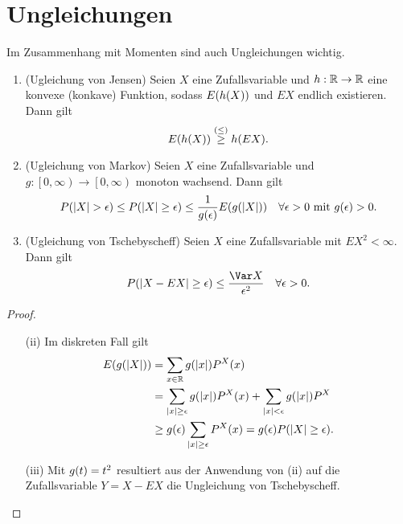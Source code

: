 \documentclass{lecture}
\begin{document}
    \section*{Ungleichungen}

    Im Zusammenhang mit Momenten sind auch Ungleichungen wichtig.

    \begin{theorem}
        \begin{enumerate}
            \item (Ugleichung von Jensen) Seien \(X\) eine Zufallsvariable und \(h: \mathbb{R} \to \mathbb{R}\) eine konvexe (konkave) Funktion, sodass \(E\parentheses*{h\parentheses*{X}}\) und \(EX\) endlich existieren.
            Dann gilt
            \[
                E\parentheses*{h\parentheses*{X}} \stackrel{\parentheses*{\le}}{\ge} h\parentheses*{EX}.
            \]
            \item (Ugleichung von Markov) Seien \(X\) eine Zufallsvariable und \(g: \left[0, \infty\right) \to \left[0, \infty\right)\) monoton wachsend.
            Dann gilt
            \[
                P\parentheses*{\absolute*{X} > \epsilon} \le P\parentheses*{\absolute*{X} \ge \epsilon} \le \frac{1}{g\parentheses*{\epsilon}}E\parentheses*{g\parentheses*{\absolute*{X}}} \quad \forall\epsilon > 0\text{ mit }g\parentheses*{\epsilon} > 0.
            \]
            \item (Ugleichung von Tschebyscheff) Seien \(X\) eine Zufallsvariable mit \(EX^2 < \infty\).
            Dann gilt
            \[
                P\parentheses*{\absolute*{X - EX} \ge \epsilon} \le \frac{\Var X}{\epsilon^2} \quad \forall\epsilon > 0.
            \]
        \end{enumerate}
    \end{theorem}

    \begin{proof}
        \begin{enumerate}
            \item[(ii)] Im diskreten Fall gilt
            \begin{align*}
                E\parentheses*{g\parentheses*{\absolute*{X}}} &= \sum_{x \in \R}g\parentheses*{\absolute*{x}}P^X\parentheses*{x}\\
                &= \sum_{\absolute*{x} \ge \epsilon}g\parentheses*{\absolute*{x}}P^X\parentheses*{x} + \sum_{\absolute*{x} < \epsilon}g\parentheses*{\absolute*{x}}P^X\\
                &\ge g\parentheses*{\epsilon}\sum_{\absolute*{x} \ge \epsilon}P^X\parentheses*{x} = g\parentheses*{\epsilon}P\parentheses*{\absolute*{X} \ge \epsilon}.
            \end{align*}
            \item[(iii)] Mit \(g\parentheses*{t} = t^2\) resultiert aus der Anwendung von (ii) auf die Zufallsvariable \(Y = X - EX\) die Ungleichung von Tschebyscheff.
        \end{enumerate}
    \end{proof}
\end{document}
